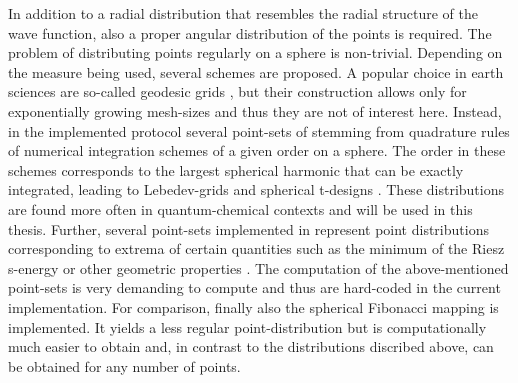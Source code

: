In addition to a radial distribution that resembles the radial structure of the wave function, also a proper angular distribution of the points is required.
The problem of distributing points regularly on a sphere is non-trivial.
Depending on the measure being used, several schemes are proposed.
A popular choice in earth sciences are so-called geodesic grids \cite{geodesic1,geodesic2,geodes_charge}, but their construction allows only for exponentially growing mesh-sizes and thus they are not of interest here.
Instead, in the implemented protocol several point-sets of stemming from quadrature rules of numerical integration schemes of a given order on a sphere.
The order in these schemes corresponds to the largest spherical harmonic that can be exactly integrated, leading to Lebedev-grids \cite{lebedev,lebedev2} and spherical t-designs \cite{t-design1, t-design2}.
These distributions are found more often in quantum-chemical contexts \cite{LebQC1,LebQC2,lebDFT,lebDFT2} and will be used in this thesis.
Further, several point-sets implemented in  represent point distributions corresponding to extrema of certain quantities such as the minimum of the Riesz s-energy\cite{fliegeMaier} or other geometric properties \cite{womersley,wom2,wom3}.
The computation of the above-mentioned point-sets is very demanding to compute and thus are hard-coded in the current implementation.
For comparison, finally also the spherical Fibonacci mapping \cite{fibonacci,fibonacci2} is implemented.
It yields a less regular point-distribution but is computationally much easier to obtain and, in contrast to the distributions discribed above, can be obtained for any number of points.
